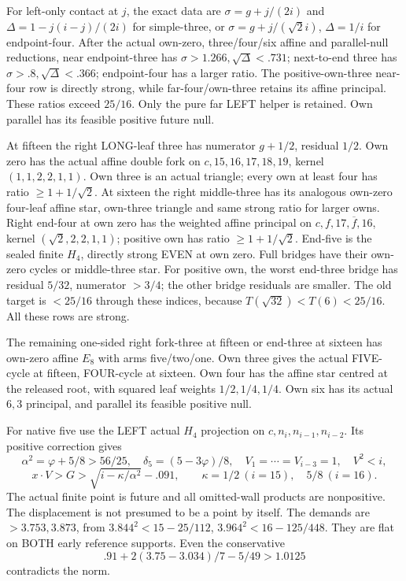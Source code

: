 \documentclass[11pt]{article}
\theoremstyle{definition}
\theoremstyle{remark}
\begin{document}
For left-only contact at \(j\),
the exact data are
\(\sigma=g+j/(2i)\) and
\(\Delta=1-j(i-j)/(2i)\)
for simple-three, or
\(\sigma=g+j/(\sqrt2i)\),
\(\Delta=1/i\) for endpoint-four.
After the actual own-zero,
three/four/six affine and
parallel-null reductions, near
endpoint-three has
\(\sigma>1.266,\sqrt\Delta<.731\);
next-to-end three has
\(\sigma>.8,\sqrt\Delta<.366\);
endpoint-four has a larger ratio.
The positive-own-three near-four
row is directly strong, while
far-four/own-three retains its
affine principal.
These ratios exceed \(25/16\).
Only the pure far LEFT helper
is retained.
Own parallel has its feasible
positive future null.

At fifteen the right LONG-leaf
three has numerator \(g+1/2\),
residual \(1/2\).
Own zero has the actual affine
double fork on
\(c,15,16,17,18,19\), kernel
\((1,1,2,2,1,1)\).
Own three is an actual triangle;
every own at least four has
ratio \(\ge1+1/\sqrt2\).
At sixteen the right middle-three
has its analogous own-zero
four-leaf affine star, own-three
triangle and same strong ratio
for larger owns.
Right end-four at own zero has
the weighted affine principal
on \(c,f,17,\overline f,16\),
kernel \((\sqrt2,2,2,1,1)\);
positive own has ratio
\(\ge1+1/\sqrt2\).
End-five is the sealed finite
\(H_4\), directly strong EVEN
at own zero.
Full bridges have their own-zero
cycles or middle-three star.
For positive own, the worst
end-three bridge has residual
\(5/32\), numerator \(>3/4\);
the other bridge residuals are
smaller.
The old target is \(<25/16\)
through these indices, because
\(T(\sqrt{32})<T(6)<25/16\).
All these rows are strong.

The remaining one-sided right
fork-three at fifteen or end-three
at sixteen has own-zero affine
\(E_8\) with arms five/two/one.
Own three gives the actual FIVE-
cycle at fifteen, FOUR-cycle
at sixteen.
Own four has the affine star
centred at the released root,
with squared leaf weights
\(1/2,1/4,1/4\).
Own six has its actual \(6,3\)
principal, and parallel its
feasible positive null.

For native five use the LEFT
actual \(H_4\) projection on
\(c,n_i,n_{i-1},n_{i-2}\).
Its positive correction gives
\[
 \alpha^2=\varphi+5/8>56/25,\quad
 \delta_5=(5-3\varphi)/8,\quad
 V_1=\cdots=V_{i-3}=1,\quad V^2<i,
\]
\[
 x\cdot V>G>
       \sqrt{i-\kappa/\alpha^2}-.091,\qquad
       \kappa=1/2\ (i=15),\quad5/8\ (i=16).
\]
The actual finite point is future
and all omitted-wall products
are nonpositive.
The displacement is not presumed
to be a point by itself.
The demands are \(>3.753,3.873\),
from
\(3.844^2<15-25/112\),
\(3.964^2<16-125/448\).
They are flat on BOTH early
reference supports.
Even the conservative
\[
                      .91+2(3.75-3.034)/7-5/49>1.0125
\]
contradicts the norm.
\end{document}
